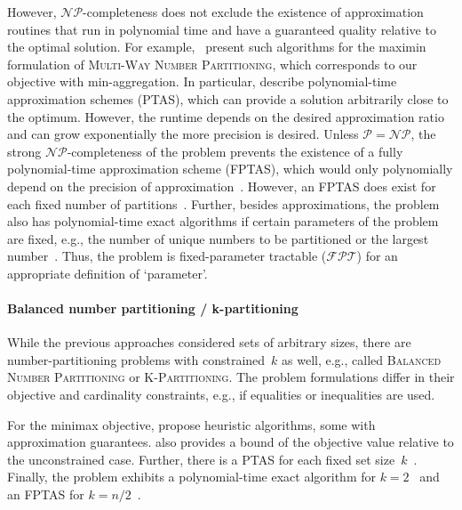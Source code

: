 \documentclass{article}
\theoremstyle{definition}
\begin{document}
However, $\mathcal{NP}$-completeness does not exclude the existence of approximation routines that run in polynomial time and have a guaranteed quality relative to the optimal solution.
For example, \cite{alon1998approximation, deuermeyer1982scheduling, woeginger1997polynomial}~present such algorithms for the maximin formulation of \textsc{Multi-Way Number Partitioning}, which corresponds to our objective with min-aggregation.
In particular, \cite{alon1998approximation, woeginger1997polynomial} describe polynomial-time approximation schemes (PTAS), which can provide a solution arbitrarily close to the optimum.
However, the runtime depends on the desired approximation ratio and can grow exponentially the more precision is desired.
Unless $\mathcal{P}=\mathcal{NP}$, the strong $\mathcal{NP}$-completeness of the problem prevents the existence of a fully polynomial-time approximation scheme (FPTAS), which would only polynomially depend on the precision of approximation~\cite{alon1998approximation, woeginger1997polynomial}.
However, an FPTAS does exist for each fixed number of partitions~\cite{sahni1976algorithms}.
Further, besides approximations, the problem also has polynomial-time exact algorithms if certain parameters of the problem are fixed, e.g., the number of unique numbers to be partitioned or the largest number~\cite{mnich2018parameterized}.
Thus, the problem is fixed-parameter tractable ($\mathcal{FPT}$) for an appropriate definition of `parameter'.

\paragraph{Balanced number partitioning / k-partitioning}

While the previous approaches considered sets of arbitrary sizes, there are number-partitioning problems with constrained~$k$ as well, e.g., called \textsc{Balanced Number Partitioning} or \textsc{K-Partitioning}.
The problem formulations differ in their objective and cardinality constraints, e.g., if equalities or inequalities are used.

For the minimax objective, \cite{babel1998thek, michiels2012computer, zhang2011heuristic} propose heuristic algorithms, some with approximation guarantees.
\cite{babel1998thek} also provides a bound of the objective value relative to the unconstrained case.
Further, there is a PTAS for each fixed set size~$k$~\cite{michiels2012computer}.
Finally, the problem exhibits a polynomial-time exact algorithm for $k=2$~\cite{dellamico2004heuristic, dellamico2001bounds} and an FPTAS for $k=n/2$~\cite{woeginger2005comment}.
\end{document}
